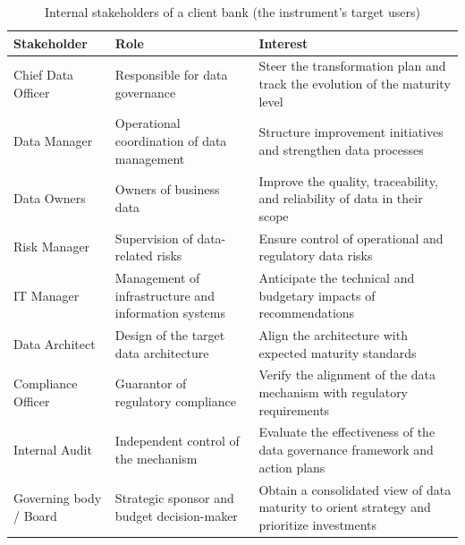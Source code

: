 \begin{table}[H]
\centering
\caption{Internal stakeholders of a client bank (the instrument's target users)} \label{tab:stakeholders-bank}

\footnotesize
\setlength{\tabcolsep}{4pt}
\begin{tabular}{|p{3.0cm}|p{4.6cm}|p{6.9cm}|}
\hline
\textbf{Stakeholder} & \textbf{Role} & \textbf{Interest} \\
\hline
Chief Data Officer & Responsible for data governance & Steer the transformation plan and track the evolution of the maturity level \\
\hline
Data Manager & Operational coordination of data management & Structure improvement initiatives and strengthen data processes \\
\hline
Data Owners & Owners of business data & Improve the quality, traceability, and reliability of data in their scope \\
\hline
Risk Manager & Supervision of data-related risks & Ensure control of operational and regulatory data risks \\
\hline
IT Manager & Management of infrastructure and information systems & Anticipate the technical and budgetary impacts of recommendations \\
\hline
Data Architect & Design of the target data architecture & Align the architecture with expected maturity standards \\
\hline
Compliance Officer & Guarantor of regulatory compliance & Verify the alignment of the data mechanism with regulatory requirements \\
\hline
Internal Audit & Independent control of the mechanism & Evaluate the effectiveness of the data governance framework and action plans \\
\hline
Governing body / Board & Strategic sponsor and budget decision-maker & Obtain a consolidated view of data maturity to orient strategy and prioritize investments \\
\hline
\end{tabular}

\end{table}

